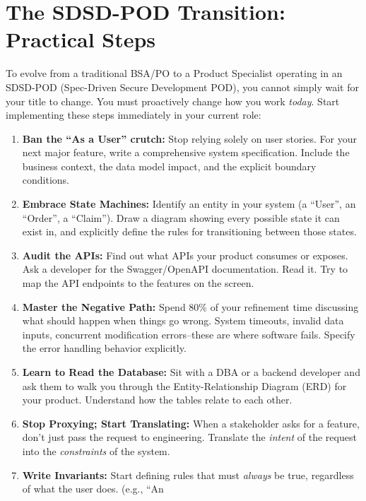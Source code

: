 \documentclass[
  11pt,
  openany,
  oneside]{book}
\providecommand{\tightlist}{%
  \setlength{\itemsep}{0pt}\setlength{\parskip}{0pt}}
\begin{document}
\bigskip

\section{The SDSD-POD Transition: Practical
Steps}\label{the-sdsd-pod-transition-practical-steps}

To evolve from a traditional BSA/PO to a Product Specialist operating in
an SDSD-POD (Spec-Driven Secure Development POD), you cannot simply wait
for your title to change. You must proactively change how you work
\emph{today}. Start implementing these steps immediately in your current
role:

\begin{enumerate}
\def\labelenumi{\arabic{enumi}.}
\tightlist
\item
  \textbf{Ban the ``As a User'' crutch:} Stop relying solely on user
  stories. For your next major feature, write a comprehensive system
  specification. Include the business context, the data model impact,
  and the explicit boundary conditions.
\item
  \textbf{Embrace State Machines:} Identify an entity in your system (a
  ``User'', an ``Order'', a ``Claim''). Draw a diagram showing every
  possible state it can exist in, and explicitly define the rules for
  transitioning between those states.
\item
  \textbf{Audit the APIs:} Find out what APIs your product consumes or
  exposes. Ask a developer for the Swagger/OpenAPI documentation. Read
  it. Try to map the API endpoints to the features on the screen.
\item
  \textbf{Master the Negative Path:} Spend 80\% of your refinement time
  discussing what should happen when things go wrong. System timeouts,
  invalid data inputs, concurrent modification errors--these are where
  software fails. Specify the error handling behavior explicitly.
\item
  \textbf{Learn to Read the Database:} Sit with a DBA or a backend
  developer and ask them to walk you through the Entity-Relationship
  Diagram (ERD) for your product. Understand how the tables relate to
  each other.
\item
  \textbf{Stop Proxying; Start Translating:} When a stakeholder asks for
  a feature, don't just pass the request to engineering. Translate the
  \emph{intent} of the request into the \emph{constraints} of the
  system.
\item
  \textbf{Write Invariants:} Start defining rules that must
  \emph{always} be true, regardless of what the user does. (e.g., ``An

\end{enumerate}
\end{document}
